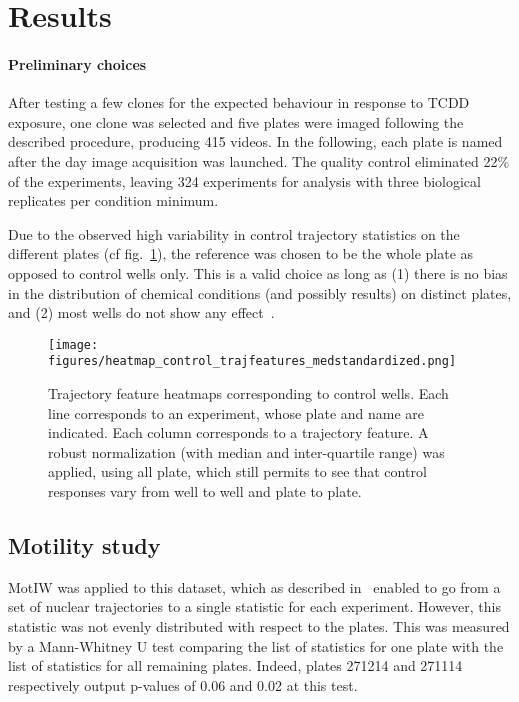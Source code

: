 \section{Results}
\paragraph{Preliminary choices}
After testing a few clones for the expected behaviour in response to TCDD exposure, one clone was selected and five plates were imaged following the described procedure, producing 415 videos. In the following, each plate is named after the day image acquisition was launched. The quality control eliminated 22\% of the experiments, leaving 324 experiments for analysis with three biological replicates per condition minimum.

Due to the observed high variability in control trajectory statistics on the different plates (cf fig.~\ref{control_heatmap}), the reference was chosen to be the whole plate as opposed to control wells only. This is a valid choice as long as (1) there is no bias in the distribution of chemical conditions (and possibly results) on distinct plates, and (2) most wells do not show any effect~\cite{pmid19644458}. 
\begin{figure}
\centering
\texttt{[image: figures/heatmap\_control\_trajfeatures\_medstandardized.png]}
\caption{Trajectory feature heatmaps corresponding to control wells. Each line corresponds to an experiment, whose plate and name are indicated. Each column corresponds to a trajectory feature. A robust normalization (with median and inter-quartile range) was applied, using all plate, which still permits to see that control responses vary from well to well and plate to plate.}
\label{control_heatmap}
\end{figure}

\subsection{Motility study}
\label{sec:xb_motility}
MotIW was applied to this dataset, which as described in~\cite{motiw} enabled to go from a set of nuclear trajectories to a single statistic for each experiment. However, this statistic was not evenly distributed with respect to the plates. This was measured by a Mann-Whitney U test comparing the list of statistics for one plate with the list of statistics for all remaining plates. Indeed, plates 271214 and 271114 respectively output p-values of 0.06 and 0.02 at this test.

